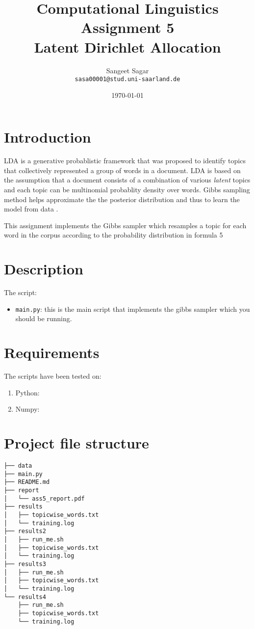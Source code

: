 \documentclass{article}[a4paper]
\title{\textbf{Computational Linguistics} \\
Assignment 5\\
Latent Dirichlet Allocation 
}
\author{Sangeet Sagar\\
            \texttt{sasa00001@stud.uni-saarland.de}
}
\date{\today}
\begin{document}
\maketitle
\section{Introduction}
LDA is a generative probablistic framework that was proposed to identify topics that collectively represented a group of words in a document. LDA is based on the assumption that a document consists of a combination of various \textit{latent} topics and each topic can be multinomial probablity density over words. Gibbs sampling method helps approximate the the posterior distribution and thus to learn the model from data \citep{Darling2011}.

This assignment implements the Gibbs sampler which resamples a topic for each word in the corpus according to the probability distribution in formula 5 \citep{Griffiths5228}

\section{Description}
The script:
\begin{itemize}
    \item \texttt{main.py}: this is the main script that implements the gibbs sampler  which you should be running.
\end{itemize}

\section{Requirements}
The scripts have been tested on:
\begin{enumerate}
    \item Python: 
    \item Numpy: 
\end{enumerate}

\section{Project file structure}
\begin{Verbatim}
├── data
├── main.py
├── README.md
├── report
│   └── ass5_report.pdf
├── results
│   ├── topicwise_words.txt
│   └── training.log
├── results2
│   ├── run_me.sh
│   ├── topicwise_words.txt
│   └── training.log
├── results3
│   ├── run_me.sh
│   ├── topicwise_words.txt
│   └── training.log
└── results4
    ├── run_me.sh
    ├── topicwise_words.txt
    └── training.log

 \end{Verbatim}
\end{document}
